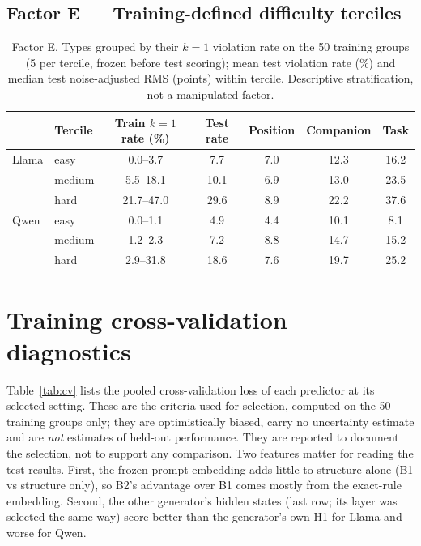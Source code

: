 \documentclass{article}
\begin{document}
\subsection*{Factor E --- Training-defined difficulty terciles}
\begin{table}[h]
\centering\scriptsize
\caption{Factor E. Types grouped by their $k=1$ violation rate on the 50 training groups (5 per tercile, frozen before test scoring); mean test violation rate (\%) and median test noise-adjusted RMS (points) within tercile. Descriptive stratification, not a manipulated factor.}
\label{tab:E}
\begin{tabular}{llccccc}
\toprule
 & Tercile & Train $k{=}1$ rate (\%) & Test rate & Position & Companion & Task \\
\midrule
Llama & easy & 0.0--3.7 & 7.7 & 7.0 & 12.3 & 16.2 \\
 & medium & 5.5--18.1 & 10.1 & 6.9 & 13.0 & 23.5 \\
 & hard & 21.7--47.0 & 29.6 & 8.9 & 22.2 & 37.6 \\
\midrule
Qwen & easy & 0.0--1.1 & 4.9 & 4.4 & 10.1 & 8.1 \\
 & medium & 1.2--2.3 & 7.2 & 8.8 & 14.7 & 15.2 \\
 & hard & 2.9--31.8 & 18.6 & 7.6 & 19.7 & 25.2 \\
\bottomrule
\end{tabular}
\end{table}


\clearpage
\section{Training cross-validation diagnostics}
\label{app:cv}

Table~\ref{tab:cv} lists the pooled cross-validation loss of each predictor at its selected setting. These are the
criteria used for selection, computed on the 50 training groups only; they are optimistically biased, carry no
uncertainty estimate and are \emph{not} estimates of held-out performance. They are reported to document the selection,
not to support any comparison. Two features matter for reading the test results. First, the frozen prompt embedding
adds little to structure alone (B1 vs structure only), so B2's advantage over B1 comes mostly from the exact-rule
embedding. Second, the other generator's hidden states (last row; its layer was selected the same way) score better than the generator's own H1 for Llama and worse for Qwen.
\end{document}
